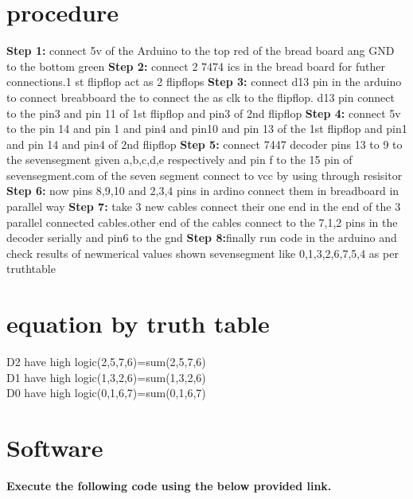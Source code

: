 \documentclass[12pt, a4paper]{article}
\begin{document}
\vspace{5mm}
\section{procedure}
\textbf{Step 1:} connect 5v of the Arduino to the top red of the bread board ang GND to the bottom green
\hfill \break
\hfill \break
\textbf{Step 2:} connect 2 7474 ics in  the bread board for futher connections.1 st flipflop act as 2 flipflops
\hfill \break
\hfill \break
\textbf{Step 3:} connect d13 pin in the arduino to connect breabboard the to connect the as clk to the flipflop. d13 pin connect to the pin3 and pin 11 of  1st flipflop and pin3 of 2nd flipflop 
\hfill \break
\hfill \break
\textbf{Step 4:} connect 5v to the pin 14 and pin 1 and pin4  and pin10 and pin 13 of the 1st flipflop and pin1 and pin 14 and pin4 of 2nd flipflop 
\hfill \break
\hfill \break
\textbf{Step 5:} connect 7447 decoder pins 13 to 9 to the sevensegment given a,b,c,d,e respectively and pin f to the 15 pin of sevensegment.com of the seven segment connect to vcc by using through resisitor  
\hfill \break
\hfill \break
\textbf{Step 6:} now pins 8,9,10 and 2,3,4 pins in ardino connect them in breadboard in parallel way
\hfill \break
\hfill \break
\textbf{Step 7:} take 3 new cables connect their one end in the end of the 3 parallel connected cables.other end of the cables connect to the 7,1,2 pins in the decoder serially and pin6 to the gnd
\hfill \break
\hfill \break
\textbf{Step 8:}finally run code in the arduino and check results of newmerical values shown sevensegment like 0,1,3,2,6,7,5,4 as per truthtable
\hfill \break
\hfill \break


\vspace{5mm}
\section{equation by truth table}
D2 have high logic(2,5,7,6)=sum(2,5,7,6)\\     \hfill \break
D1 have high logic(1,3,2,6)=sum(1,3,2,6)\\\hfill \break
D0 have high logic(0,1,6,7)=sum(0,1,6,7)\\
\hfill \break
\hfill \break

\section{Software}
\textbf{Execute the following code using the below provided link.}\\
\begin{center}
\end{center}
 
\end{document}
